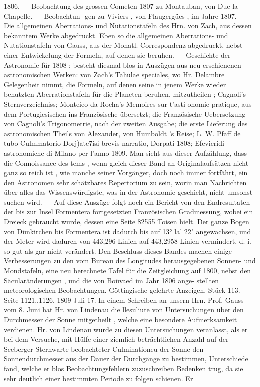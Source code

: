 \documentclass[12pt,a4paper]{article}
\begin{document}
1806.  ---  Beobachtung  des  grossen  Cometen  1807  zu  Montauban,  von  Duc-la  Chapelle. ---  Beobachtun- gen zu  Viviers ,  von  Flaugergües  ,  im  Jahre  1807.  ---  Die  allgemeinen  Aberrations-  und  Nutationstafeln des  Hrn.  von  Zach,  aus  dessen  bekanntem  Werke  abgedruckt.  Eben  so  die  allgemeinen  Aberrations- und Nutationstafeln  von  Gauss,  aus  der  Monatl.  Correspondenz  abgedruckt,  nebst  einer  Entwickelung der  Formeln,  auf  denen  sie  beruhen.  ---  Geschichte  der  Astronomie  für  1808 :  besteht  diesmal  blos  in Auszügen  aus  neu  erschienenen  astronomischen  Werken:  von  Zach's  Tahulae  speciales,  wo  Hr.  Delambre Gelegenheit  nimmt,  die  Formeln,  auf  denen  seine  in  jenem  Werke  wieder  benutzten  Aberrationstafeln für  die  Planeten  beruhen,  mitzutheilen ;  Cagnoli's  Sternverzeichniss;  Monteieo-da-Rocha's  Memoires  sur t'asti-onomie  pratique,  aus  dem  Portugiesischen  ins  Französische  übersetzt;  die  Französische  Uebersetzung von  Cagnoli's  Trigonometrie,  nach  der  zweiten  Ausgabe;  die  erste  Lieferung  des  astronomischen  Theils von  Alexander,  von  Humboldt 's  Reise;  L.  W.  Pfaff  de  tubo  Culmmatorio  Dorj)ate7isi  brevis  narratio, Dorpati  1808;  Efevieridi  astronomiche  di  Milano  per  l'anno  1809.  Man  sieht  aus  dieser  Aufzählung,  dass die  Connoissancc  des  tems ,  wenn  gleich  dieser  Band  an  Originalaufsätzen  nicht  ganz  so  reich  ist ,  wie manche  seiner  Vorgänger,  doch  noch  immer  fortfährt,  ein  den  Astronomen  sehr  schätzbares  Repertorium zu  sein,  worin  man  Nachrichten  über  alles  das  Wissenswürdigste,  was  in  der  Astronomie  geschieht,  nicht umsonst  suchen  wird.  ---  Auf  diese  Auszüge  folgt  noch  ein  Bericht  von  den  Endresultaten  der  bis  zur Insel  Formentera  fortgesetzten  Französischen  Gradmessung,  wobei  ein  Dreieck  gebraucht  wurde,  dessen eine  Seite  82555  Toisen  hielt.  Der  ganze  Bogen  von  Dünkirchen  bis  Formentera  ist  dadurch  bis  auf 13°  la'  22"  angewachsen,  und  der  Meter  wird  dadurch  von  443,296  Linien  auf  443,2958  Linien  vermindert, d.  i.  so  gut  als  gar  nicht  verändert.  Den  Beschluss  dieses  Bandes  machen  einige  Verbesserungen  zu den  vom  Bureau  des  Longitudes  herausgegebenen  Sonnen-  und  Mondstafeln,  eine  neu  berechnete  Tafel für  die  Zeitgleichung  auf  1800,  nebst  den  Säcularänderungen ,  und  die  von  Boüvaed  im  Jahr  1806  ange- stellten meteorologischen  Beobachtungen. Göttingische  gelehrte  Anzeigen.     Stück  113.     Seite  1121..1126.     1809   Juli  17. In  einem  Schreiben  an  unsern  Hrn.  Prof.  Gauss  vom  8.  Juni  hat  Hr.  von  Lindenau  die  llesuliute von  Untersuchungen  über  den  Durchmesser  der  Sonne  mitgetheilt ,  welche  eine  besondere  Aufmerksamkeit verdienen.  Hr.  von  Lindenau  wurde  zu  diesen  Untersuchungen  veranlasst,  als  er  bei  dem  Versuche,  mit Hülfe  einer  ziemlich  beträchtlichen  Anzahl  auf  der  Seeberger  Sternwarte  beobachteter  Culminationeu der  Sonne  den  Sonnendurchmesser  aus  der  Dauer  der  Durchgänge  zu  bestimmen,  Unterschiede  fand, welche  er  blos  Beobachtungsfehlern  zuzuschreiben  Bedenken  trug,  da  sie  sehr  deutlich  einer  bestimmten Periode  zu  folgen  schienen.  Er  
\end{document}
